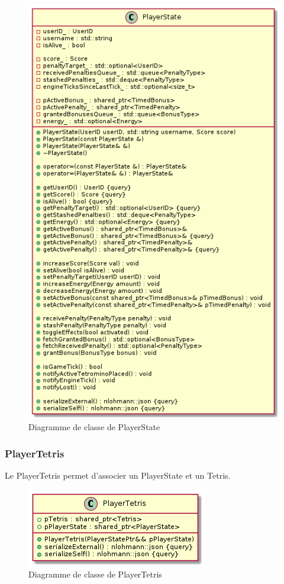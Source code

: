 \documentclass{article}
\begin{document}
\begin{figure}[!h]
	\centering
	 \includegraphics[scale=0.6]{../../res/uml/class/PlayerStateClass.png}
	 \caption{Diagramme de classe de PlayerState}
	 \label{fig:PlayerStateDiagram}
\end{figure}

\subsubsection*{PlayerTetris}

Le PlayerTetris permet d'associer un PlayerState et un Tetris.

\begin{figure}[!h]
	\centering
	 \includegraphics[scale=0.6]{../../res/uml/class/PlayerTetrisClass.png}
	 \caption{Diagramme de classe de PlayerTetris}
	 \label{fig:PlayerTetrisDiagram}
\end{figure}
\end{document}
